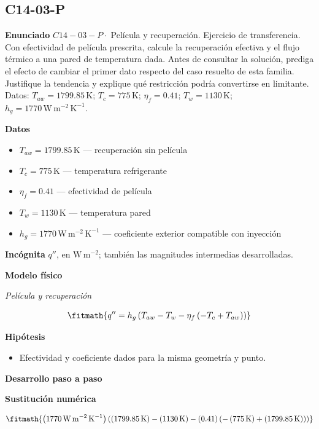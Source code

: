 \documentclass[10pt,openany]{book}
\begin{document}
\subsection*{C14-03-P}

\noindent\textbf{Enunciado}
\(C14-03-P \cdot\) Película y recuperación. Ejercicio de transferencia. Con efectividad de película prescrita, calcule la recuperación efectiva y el flujo térmico a una pared de temperatura dada. Antes de consultar la solución, prediga el efecto de cambiar el primer dato respecto del caso resuelto de esta familia. Justifique la tendencia y explique qué restricción podría convertirse en limitante. Datos: \(T_{aw}=1799.85\, \mathrm{K}\); \(T_c=775\, \mathrm{K}\); \(\eta_f=0.41\); \(T_w=1130\, \mathrm{K}\); \(h_g=1770\, \mathrm{W}\,\mathrm{m}^{-2}\,\mathrm{K}^{-1}\).

\noindent\textbf{Datos}
\begin{itemize}
\item $T_{aw} = 1799.85\,\mathrm{K}$ — recuperación sin película
\item $T_c = 775\,\mathrm{K}$ — temperatura refrigerante
\item $\eta_f = 0.41$ — efectividad de película
\item $T_w = 1130\,\mathrm{K}$ — temperatura pared
\item $h_g = 1770\,\mathrm{W}\,\mathrm{m}^{-2}\,\mathrm{K}^{-1}$ — coeficiente exterior compatible con inyección
\end{itemize}

\noindent\textbf{Incógnita}
$q''$, en $\mathrm{W\,m^{-2}}$; también las magnitudes intermedias desarrolladas.

\noindent\textbf{Modelo físico}

\noindent\textit{Película y recuperación}

\[
\fitmath{q''=h_g \left(T_{aw} - T_w - \eta_f \left(- T_c + T_{aw}\right)\right)}
\]

\noindent\textbf{Hipótesis}
\begin{itemize}
\item Efectividad y coeficiente dados para la misma geometría y punto.
\end{itemize}

\noindent\textbf{Desarrollo paso a paso}



\noindent\textbf{Sustitución numérica}

\[
\fitmath{\left(1770\,\mathrm{W}\,\mathrm{m}^{-2}\,\mathrm{K}^{-1}\right) \left(\left(1799.85\,\mathrm{K}\right) - \left(1130\,\mathrm{K}\right) - \left(0.41\right) \left(- \left(775\,\mathrm{K}\right) + \left(1799.85\,\mathrm{K}\right)\right)\right)}
\]
\end{document}
